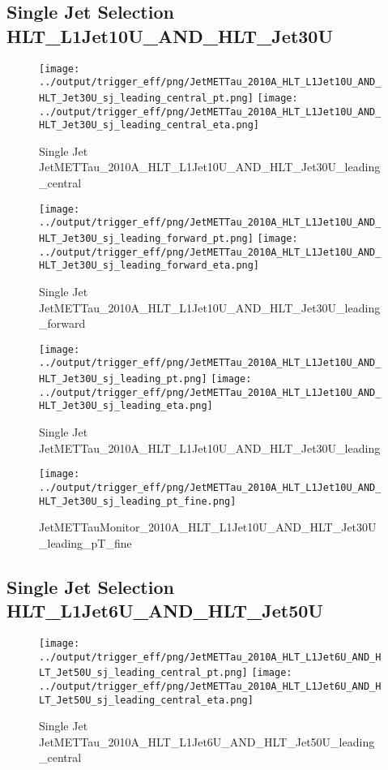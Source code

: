 \documentclass[11pt]{article}
\begin{document}
\newpage
\subsection{Single Jet Selection HLT\_L1Jet10U\_AND\_HLT\_Jet30U}
\begin{figure}[ht]
\centering
\texttt{[image: ../output/trigger\_eff/png/JetMETTau\_2010A\_HLT\_L1Jet10U\_AND\_HLT\_Jet30U\_sj\_leading\_central\_pt.png]}
\texttt{[image: ../output/trigger\_eff/png/JetMETTau\_2010A\_HLT\_L1Jet10U\_AND\_HLT\_Jet30U\_sj\_leading\_central\_eta.png]}
\caption{Single Jet JetMETTau\_2010A\_HLT\_L1Jet10U\_AND\_HLT\_Jet30U\_leading\_central}
\label{fig:jetmettau_sj_HLT_L1Jet10U_AND_HLT_Jet30U_leading_central}
\end{figure}

\begin{figure}[ht]
\centering
\texttt{[image: ../output/trigger\_eff/png/JetMETTau\_2010A\_HLT\_L1Jet10U\_AND\_HLT\_Jet30U\_sj\_leading\_forward\_pt.png]}
\texttt{[image: ../output/trigger\_eff/png/JetMETTau\_2010A\_HLT\_L1Jet10U\_AND\_HLT\_Jet30U\_sj\_leading\_forward\_eta.png]}
\caption{Single Jet JetMETTau\_2010A\_HLT\_L1Jet10U\_AND\_HLT\_Jet30U\_leading\_forward}
\label{fig:jetmettau_sj_HLT_L1Jet10U_AND_HLT_Jet30U_leading_forward}
\end{figure}

\begin{figure}[ht]
\centering
\texttt{[image: ../output/trigger\_eff/png/JetMETTau\_2010A\_HLT\_L1Jet10U\_AND\_HLT\_Jet30U\_sj\_leading\_pt.png]}
\texttt{[image: ../output/trigger\_eff/png/JetMETTau\_2010A\_HLT\_L1Jet10U\_AND\_HLT\_Jet30U\_sj\_leading\_eta.png]}
\caption{Single Jet JetMETTau\_2010A\_HLT\_L1Jet10U\_AND\_HLT\_Jet30U\_leading}
\label{fig:jetmettau_sj_HLT_L1Jet10U_AND_HLT_Jet30U_leading}
\end{figure}

\begin{figure}[ht]
\centering
\texttt{[image: ../output/trigger\_eff/png/JetMETTau\_2010A\_HLT\_L1Jet10U\_AND\_HLT\_Jet30U\_sj\_leading\_pt\_fine.png]}
\caption{JetMETTauMonitor\_2010A\_HLT\_L1Jet10U\_AND\_HLT\_Jet30U\_leading\_pT\_fine}
\label{fig:jetmettau_sj_HLT_L1Jet10U_AND_HLT_Jet30U_leading_pT_fine}
\end{figure}
\clearpage

\newpage
\subsection{Single Jet Selection HLT\_L1Jet6U\_AND\_HLT\_Jet50U}
\begin{figure}[ht]
\centering
\texttt{[image: ../output/trigger\_eff/png/JetMETTau\_2010A\_HLT\_L1Jet6U\_AND\_HLT\_Jet50U\_sj\_leading\_central\_pt.png]}
\texttt{[image: ../output/trigger\_eff/png/JetMETTau\_2010A\_HLT\_L1Jet6U\_AND\_HLT\_Jet50U\_sj\_leading\_central\_eta.png]}
\caption{Single Jet JetMETTau\_2010A\_HLT\_L1Jet6U\_AND\_HLT\_Jet50U\_leading\_central}
\label{fig:jetmettau_sj_L1Jet6U_AND_HLT_Jet50U_leading_central}
\end{figure}
\end{document}
